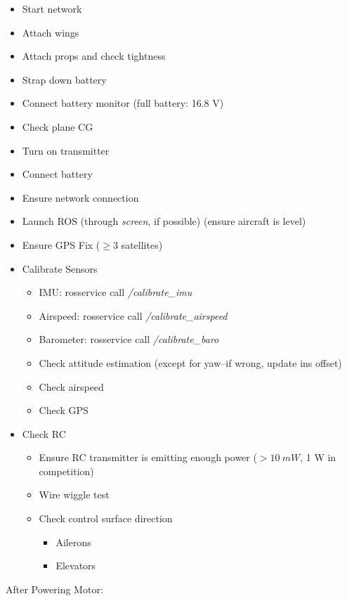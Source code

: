 \documentclass[]{auvsi_doc}
\begin{document}
\begin{itemize}
	\item Start network
	\item Attach wings%
	\item Attach props and check tightness
	\item Strap down battery
	\item Connect battery monitor (full battery: 16.8 V)
	\item Check plane CG
	\item Turn on transmitter
	\item Connect battery
	\item Ensure network connection
	\item Launch ROS (through \textit{screen}, if possible) (ensure aircraft is level)
	\item Ensure GPS Fix ($\geq 3$ satellites)
	\item Calibrate Sensors
	\begin{itemize}
		\item IMU: rosservice call \textit{/calibrate\_imu}
		\item Airspeed: rosservice call \textit{/calibrate\_airspeed}
		\item Barometer: rosservice call \textit{/calibrate\_baro}
		\item Check attitude estimation (except for yaw--if wrong, update ins offset)
		\item Check airspeed
		\item Check GPS
	\end{itemize}
	\item Check RC
	\begin{itemize}
		\item Ensure RC transmitter is emitting enough power ($>10~mW$, 1 W in competition)
		\item Wire wiggle test
		\item Check control surface direction
		\begin{itemize}
			\item Ailerons
			\item Elevators
		\end{itemize}
	\end{itemize}
\end{itemize}

After Powering Motor:
\end{document}
